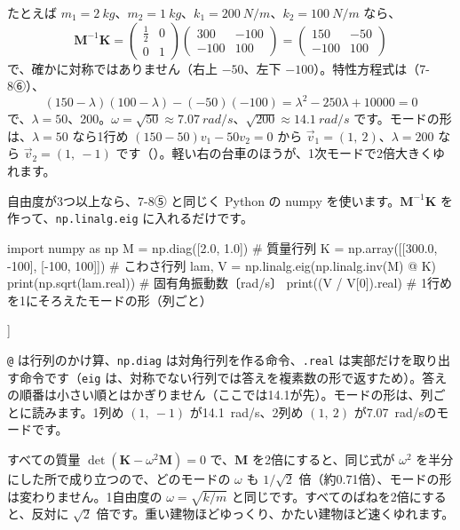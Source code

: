 たとえば $m_1=\qty{2}{kg}$、$m_2=\qty{1}{kg}$、$k_1=\qty{200}{N/m}$、$k_2=\qty{100}{N/m}$ なら、
\[\mathbf M^{-1}\mathbf K=\begin{pmatrix}\tfrac12&0\\0&1\end{pmatrix}\begin{pmatrix}300&-100\\-100&100\end{pmatrix}=\begin{pmatrix}150&-50\\-100&100\end{pmatrix}\]
で、確かに対称ではありません（右上 $-50$、左下 $-100$）。特性方程式は（7-8⑥）、
\[(150-\lambda)(100-\lambda)-(-50)(-100)=\lambda^2-250\lambda+\num{10000}=0\]
で、$\lambda=50$、200。$\omega=\sqrt{50}\approx\qty{7.07}{rad/s}$、$\sqrt{200}\approx\qty{14.1}{rad/s}$ です。モードの形は、$\lambda=50$ なら1行め $(150-50)v_1-50v_2=0$ から $\vec v_1=(1,\ 2)$、$\lambda=200$ なら $\vec v_2=(1,\ -1)$ です（）。軽い右の台車のほうが、1次モードで2倍大きくゆれます。

自由度が3つ以上なら、7-8⑤ と同じく Python の numpy を使います。$\mathbf M^{-1}\mathbf K$ を作って、\texttt{np.linalg.eig} に入れるだけです。
\begin{phcode}[Python]
import numpy as np
M = np.diag([2.0, 1.0])                   \# 質量行列
K = np.array([[300.0, -100], [-100, 100]])  \# こわさ行列
lam, V = np.linalg.eig(np.linalg.inv(M) @ K)
print(np.sqrt(lam.real))    \# 固有角振動数〔rad/s〕
print((V / V[0]).real)      \# 1行めを1にそろえたモードの形（列ごと）
\end{phcode}
\begin{phcodeout}[実行結果]
[14.14213562  7.07106781]
[[ 1.  1.]
 [-1.  2.]]
\end{phcodeout}
\texttt{@} は行列のかけ算、\texttt{np.diag} は対角行列を作る命令、\texttt{.real} は実部だけを取り出す命令です（\texttt{eig} は、対称でない行列では答えを複素数の形で返すため）。答えの順番は小さい順とはかぎりません（ここでは14.1が先）。モードの形は、列ごとに読みます。1列め $(1,\ -1)$ が\qty{14.1}{rad/s}、2列め $(1,\ 2)$ が\qty{7.07}{rad/s}のモードです。

\begin{phbaisuru}{すべての質量}
$\det(\mathbf K-\omega^2\mathbf M)=0$ で、$\mathbf M$ を2倍にすると、同じ式が $\omega^2$ を半分にした所で成り立つので、どのモードの $\omega$ も $1/\sqrt2$ 倍（約0.71倍）、モードの形は変わりません。1自由度の $\omega=\sqrt{k/m}$ と同じです。すべてのばねを2倍にすると、反対に $\sqrt2$ 倍です。重い建物ほどゆっくり、かたい建物ほど速くゆれます。
\end{phbaisuru}

